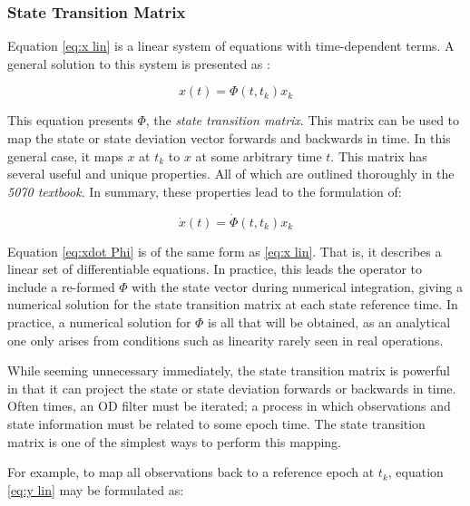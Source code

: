 \documentclass[12pt,a4paper,oneside]{article}
\numberwithin{equation}{section}   		%
\begin{document}


\subsubsection{State Transition Matrix}
\label{sec:OD sub STM}

Equation \eqref{eq:x lin} is a linear system of equations with time-dependent terms. A general solution to this system is presented as \cite{tapley2004statistical}: 

\begin{equation}
	x(t) = \Phi(t,t_k)x_k
	\label{eq:x Phi}
\end{equation}

This equation presents $\Phi$, the \emph{state transition matrix}. This matrix can be used to map the state or state deviation vector forwards and backwards in time. In this general case, it maps $x$ at $t_k$ to $x$ at some arbitrary time $t$. This matrix has several useful and unique properties. All of which are outlined thoroughly in the \emph{5070 textbook}. In summary, these properties lead to the formulation of:

\begin{equation}
	\dot{x}(t) =\dot{ \Phi}(t,t_k)x_k
	\label{eq:xdot Phi}
\end{equation}

Equation \eqref{eq:xdot Phi} is of the same form as \ref{eq:x lin}. That is, it describes a linear set of differentiable equations. In practice, this leads the operator to include a re-formed $\Phi$ with the state vector during numerical integration, giving a numerical solution for the state transition matrix at each state reference time. In practice, a numerical solution for $\Phi$ is all that will be obtained, as an analytical one only arises from conditions such as linearity rarely seen in real operations.

While seeming unnecessary immediately, the state transition matrix is powerful in that it can project the state or state deviation forwards or backwards in time. Often times, an OD filter must be iterated; a process in which observations and state information must be related to some epoch time. The state transition matrix is one of the simplest ways to perform this mapping. 

For example, to map all observations back to a reference epoch at $t_k$, equation \eqref{eq:y lin} may be formulated as:
\end{document}
